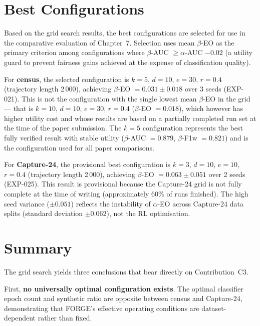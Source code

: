 \documentclass[12pt]{article}
\begin{document}
\section{Best Configurations}
\label{sec:grid-best}

Based on the grid search results, the best configurations are selected
for use in the comparative evaluation of Chapter~7.
Selection uses mean $\beta$-EO as the primary criterion among configurations
where $\beta$-AUC $\geq \alpha$-AUC $- 0.02$ (a utility guard to prevent
fairness gains achieved at the expense of classification quality).

For \textbf{census}, the selected configuration is
$k = 5$, $d = 10$, $e = 30$, $r = 0.4$ (trajectory length 2\,000),
achieving $\beta$-EO $= 0.031 \pm 0.018$ over 3 seeds (EXP-021).
This is not the configuration with the single lowest mean $\beta$-EO
in the grid --- that is $k = 10$, $d = 10$, $e = 30$, $r = 0.4$
($\beta$-EO $= 0.018$), which however has higher utility cost and
whose results are based on a partially completed run set at the time of
the paper submission.
The $k = 5$ configuration represents the best fully verified result with
stable utility ($\beta$-AUC $= 0.879$, $\beta$-F1w $= 0.821$) and
is the configuration used for all paper comparisons.

For \textbf{Capture-24}, the provisional best configuration is
$k = 3$, $d = 10$, $e = 10$, $r = 0.4$ (trajectory length 2\,000),
achieving $\beta$-EO $= 0.063 \pm 0.051$ over 2 seeds (EXP-025).
This result is provisional because the Capture-24 grid is not fully
complete at the time of writing (approximately $60\%$ of runs finished).
The high seed variance ($\pm 0.051$) reflects the instability of
$\alpha$-EO across Capture-24 data splits (standard deviation $\pm 0.062$),
not the RL optimisation.

\section{Summary}
\label{sec:grid-summary}

The grid search yields three conclusions that bear directly on Contribution~C3.

First, \textbf{no universally optimal configuration exists}.
The optimal classifier epoch count and synthetic ratio are opposite between
census and Capture-24, demonstrating that FORGE's effective operating
conditions are dataset-dependent rather than fixed.
\end{document}
